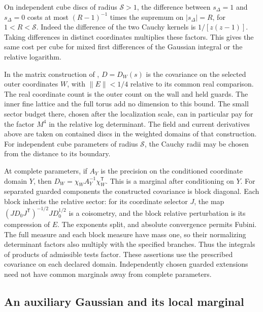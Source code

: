 \documentclass[11pt,letterpaper,reqno]{amsart}
\numberwithin{equation}{section}
\theoremstyle{definition}
\theoremstyle{remark}
\begin{document}
On independent cube discs of radius \(\mathcal S>1\), the difference between \(s_\Delta=1\)
and \(s_\Delta=0\) costs at most \((R-1)^{-1}\) times the
supremum on \(|s_\Delta|=R\), for \(1<R<\mathcal S\).
Indeed the difference of the two Cauchy kernels is
\(1/[z(z-1)]\). Taking differences in distinct coordinates
multiplies these factors. This gives the same cost per
cube for mixed first differences of the Gaussian integral
or the relative logarithm.

In the matrix construction of \cite[Theorem F and Corollary 12.1]{MB},
\(D=D_W(s)\) is the covariance on the selected outer coordinates
\(W\), with \(\|E\|<1/4\) relative to its common real comparison.
The real coordinate count is the outer count on the wall and
held guards. The inner fine lattice and the full torus add no
dimension to this bound. The small sector budget there, chosen
after the localization scale, can in particular pay for the
factor \(M^4\) in the relative log determinant. The field and
current derivatives above are taken on contained discs in the
weighted domains of that construction. For independent cube
parameters of radius \(\mathcal S\), the Cauchy radii may be
chosen from the distance to its boundary.

At complete parameters, if \(A_Y\) is the precision on the
conditioned coordinate domain \(Y\), then
\(D_W=\chi_WA_Y^{-1}\chi_W^{\mathsf T}\). This is a marginal
after conditioning on \(Y\). For separated guarded components
the constructed covariance is block diagonal. Each block
inherits the relative sector: for its coordinate selector $J$,
the map $(JD_0J^{\mathsf T})^{-1/2}JD_0^{1/2}$ is a coisometry,
and the block relative perturbation is its compression of $E$.
The exponents split, and absolute convergence permits Fubini.
The full measure and each block measure have mass one, so their
normalizing determinant factors also multiply with the specified
branches. Thus the integrals of products of admissible tests factor.
These assertions use the prescribed covariance on
each declared domain. Independently chosen guarded extensions
need not have common marginals away from complete parameters.

\subsection{An auxiliary Gaussian and its local marginal}
\end{document}
